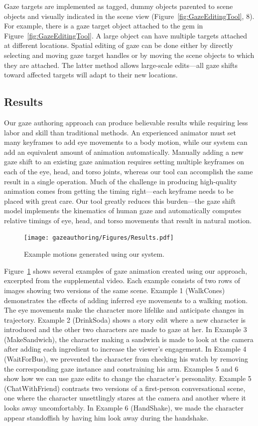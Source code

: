 Gaze targets are implemented as tagged, dummy objects parented to scene objects and visually indicated in the scene view (Figure~\ref{fig:GazeEditingTool}, 8). For example, there is a gaze target object attached to the gem in Figure~\ref{fig:GazeEditingTool}. A large object can have multiple targets attached at different locations. Spatial editing of gaze can be done either by directly selecting and moving gaze target handles or by moving the scene objects to which they are attached. The latter method allows large-scale edits---all gaze shifts toward affected targets will adapt to their new locations.

\subsection{Results}
\label{sec:GazeEditingResults}

Our gaze authoring approach can produce believable results while requiring less labor and skill than traditional methods. An experienced animator must set many keyframes to add eye movements to a body motion, while our system can add an equivalent amount of animation automatically. Manually adding a new gaze shift to an existing gaze animation requires setting multiple keyframes on each of the eye, head, and torso joints, whereas our tool can accomplish the same result in a single operation. Much of the challenge in producing high-quality animation comes from getting the timing right---each keyframe needs to be placed with great care. Our tool greatly reduces this burden---the gaze shift model implements the kinematics of human gaze and automatically computes relative timings of eye, head, and torso movements that result in natural motion.

\begin{figure}
\centering
\texttt{[image: gazeauthoring/Figures/Results.pdf]}
\caption{Example motions generated using our system.}
\label{fig:GazeEditResults}
\end{figure}

Figure~\ref{fig:GazeEditResults} shows several examples of gaze animation created using our approach, excerpted from the supplemental video. Each example consists of two rows of images showing two versions of the same scene. Example 1 (WalkCones) demonstrates the effects of adding inferred eye movements to a walking motion. The eye movements make the character more lifelike and anticipate changes in trajectory. Example 2 (DrinkSoda) shows a story edit where a new character is introduced and the other two characters are made to gaze at her. In Example 3 (MakeSandwich), the character making a sandwich is made to look at the camera after adding each ingredient to increase the viewer's engagement. In Example 4 (WaitForBus), we prevented the character from checking his watch by removing the corresponding gaze instance and constraining his arm. Examples 5 and 6 show how we can use gaze edits to change the character's personality. Example 5 (ChatWithFriend) contrasts two versions of a first-person conversational scene, one where the character unsettlingly stares at the camera and another where it looks away uncomfortably. In Example 6 (HandShake), we made the character appear standoffish by having him look away during the handshake. 